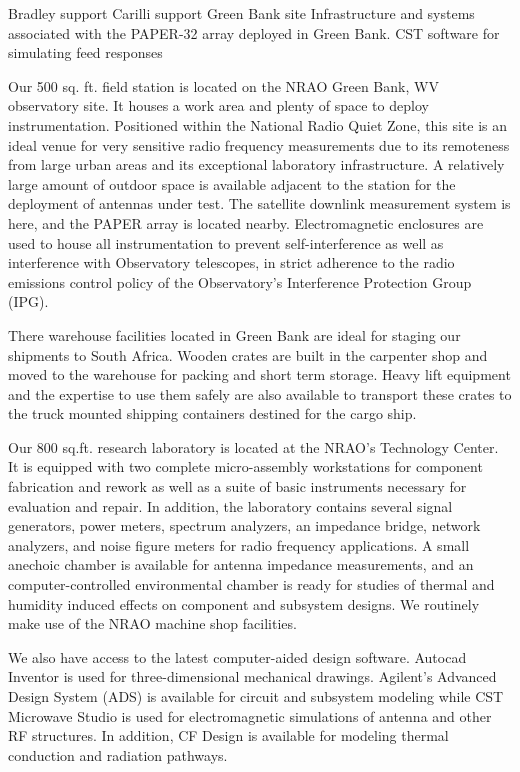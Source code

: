 \documentclass[11pt]{article}
\begin{document}
Bradley support
Carilli support
Green Bank site
Infrastructure and systems associated with the PAPER-32 array deployed in Green Bank.
CST software for simulating feed responses


Our 500 sq. ft. field station is located on the NRAO Green Bank, WV observatory
site. It houses a work area and plenty of space to deploy instrumentation.
Positioned within the National Radio Quiet Zone, this site is an ideal venue
for very sensitive radio frequency measurements due to its remoteness from
large urban areas and its exceptional laboratory infrastructure. A relatively
large amount of outdoor space is available adjacent to the station for the
deployment of antennas under test. The satellite downlink measurement system is
here, and the PAPER array is located nearby. Electromagnetic enclosures are
used to house all instrumentation to prevent self-interference as well as
interference with Observatory telescopes, in strict adherence to the radio
emissions control policy of the Observatory’s Interference Protection Group
(IPG).

There warehouse facilities located in Green Bank are ideal for staging our
shipments to South Africa. Wooden crates are built in the carpenter shop and
moved to the warehouse for packing and short term storage. Heavy lift
equipment and the expertise to use them safely are also available to transport
these crates to the truck mounted shipping containers destined for the cargo
ship.

Our 800 sq.ft. research laboratory is located at the NRAO’s Technology Center.
It is equipped with two complete micro-assembly workstations for component
fabrication and rework as well as a suite of basic instruments necessary for
evaluation and repair. In addition, the laboratory contains several signal
generators, power meters, spectrum analyzers, an impedance bridge, network
analyzers, and noise figure meters for radio frequency applications. A small
anechoic chamber is available for antenna impedance measurements, and an
computer-controlled environmental chamber is ready for studies of thermal and
humidity induced effects on component and subsystem designs. We routinely make
use of the NRAO machine shop facilities.

We also have access to the latest computer-aided design software. Autocad
Inventor is used for three-dimensional mechanical drawings. Agilent’s Advanced
Design System (ADS) is available for circuit and subsystem modeling while CST
Microwave Studio is used for electromagnetic simulations of antenna and other
RF structures. In addition, CF Design is available for modeling thermal
conduction and radiation pathways.
\end{document}
